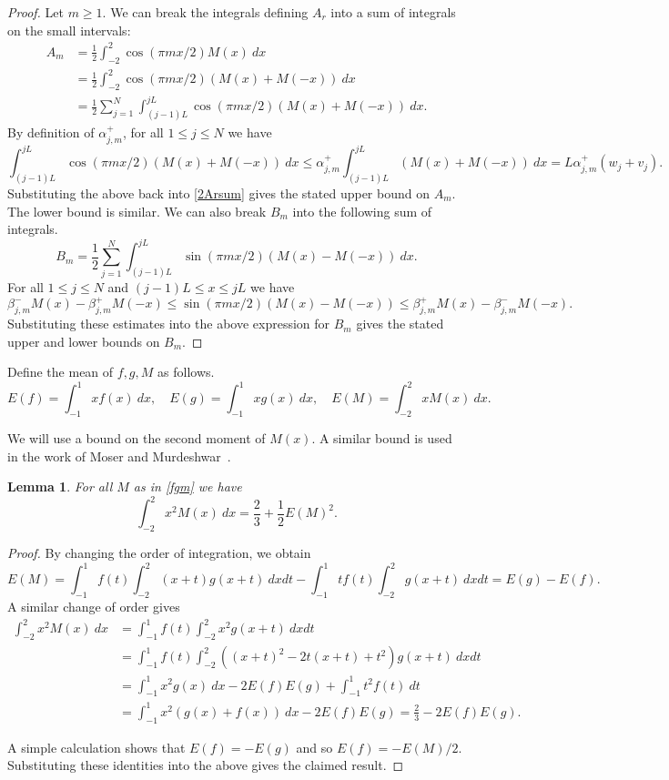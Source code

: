 \documentclass[12pt]{article}
\newtheorem{lemma}[theorem]{Lemma}
\numberwithin{equation}{section}
\begin{document}
\begin{proof} Let $m \geq 1$. We can break the integrals defining $A_r$ into a sum of integrals on the small intervals:
\begin{align} A_m &=\frac{1}{2}  \int_{-2}^2 \cos(\pi m x/2) M(x) \ dx \nonumber\\
& =  \frac{1}{2} \int_{-2}^2 \cos(\pi m x/2) (M(x) +M(-x))\ dx \nonumber\\
& = \frac{1}{2} \sum_{j=1}^N \int_{(j-1)L}^{jL}  \cos(\pi m x/2) (M(x) +M(-x))\ dx .  \label{2Arsum} \end{align}
By definition of $\alpha_{j,m}^+$, for all $1 \leq j \leq N$ we have 
\[ \int_{(j-1)L}^{jL}  \cos(\pi m x/2) (M(x) +M(-x))\ dx \leq \alpha_{j,m}^+ \int_{(j-1)L}^{jL} (M(x) +M(-x)) \ dx = L\alpha_{j,m}^+(w_j+v_j).\]
Substituting the above back into \eqref{2Arsum} gives the stated upper bound on $A_m$. The lower bound is similar. We can also break $B_m$ into the following sum of integrals.
\[ B_m = \frac{1}{2} \sum_{j=1}^N \int_{(j-1)L}^{jL}  \sin(\pi m x/2) (M(x) -M(-x))\ dx .\]
For all $1 \leq j \leq N$ and $(j-1)L \leq x \leq jL$ we have 
\[ \beta_{j,m}^- M(x) -\beta_{j,m}^+ M(-x)\leq \sin(\pi m x/2) (M(x) -M(-x)) \leq \beta_{j,m}^+ M(x) -\beta_{j,m}^- M(-x). \]
Substituting these estimates into the above expression for $B_m$ gives the stated upper and lower bounds on $B_m$.

\end{proof}


Define the mean of $f,g,M$ as follows. 
\[ E(f) = \int_{-1}^1 xf(x) \ dx,   \quad E(g) = \int_{-1}^1 xg(x) \ dx,   \quad E(M)= \int_{-2}^2 xM(x) \ dx. \]





We will use a bound on the second moment of $M(x)$. A similar bound is used in the work of Moser and Murdeshwar~\cite{M2}.

\begin{lemma}\label{centralM} For all $M$ as in \eqref{fgm} we have
\[ \int_{-2}^2 x^2M(x) \ dx = \frac{2}{3} + \frac{1}{2}E(M)^2.\]
\end{lemma}
\begin{proof} By changing the order of integration, we obtain 
\[ E(M) = \int_{-1}^1 f(t) \int_{-2}^2 (x+t)g(x+t) \ dx  dt- \int_{-1}^1 tf(t) \int_{-2}^2 g(x+t) \ dx  dt  = E(g)-E(f).\]
A similar change of order gives
\begin{align*} \int_{-2}^2 x^2M(x) \ dx &= \int_{-1}^1 f(t) \int_{-2}^2 x^2g(x+t) \ dxdt \\
& =\int_{-1}^1 f(t) \int_{-2}^2 ((x+t)^2-2t(x+t)+t^2)g(x+t) \ dxdt\\
&  = \int_{-1}^1 x^2 g(x) \ dx -2E(f)E(g) + \int_{-1}^1 t^2 f(t) \ dt \\
& =\int_{-1}^1 x^2(g(x)+f(x)) \ dx - 2E(f)E(g) = \frac{2}{3}-2E(f)E(g). \end{align*}

A simple calculation shows that $E(f) = -E(g)$ and so $E(f) = -E(M)/2$. Substituting these identities into the above gives the claimed result.

\end{proof}
\end{document}
